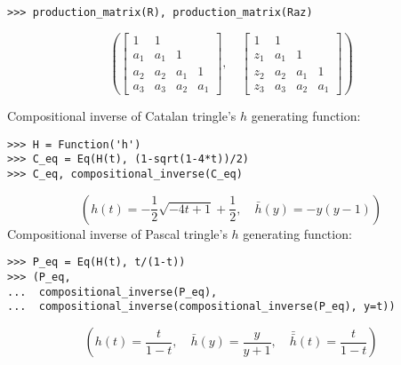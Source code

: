 \begin{example}
\begin{verbatim}
>>> production_matrix(R), production_matrix(Raz)
\end{verbatim}
\begin{displaymath}
\left ( \left[\begin{matrix}1 & 1 &   &  \\a_{1} & a_{1} & 1 &  \\a_{2} & a_{2} & a_{1} & 1\\a_{3} & a_{3} & a_{2} & a_{1}\end{matrix}\right], \quad \left[\begin{matrix}1 & 1 &   &  \\z_{1} & a_{1} & 1 &  \\z_{2} & a_{2} & a_{1} & 1\\z_{3} & a_{3} & a_{2} & a_{1}\end{matrix}\right]\right )
\end{displaymath}
\end{example}


\begin{example}
Compositional inverse of Catalan tringle's $h$ generating function:
\begin{verbatim}
>>> H = Function('h')
>>> C_eq = Eq(H(t), (1-sqrt(1-4*t))/2)
>>> C_eq, compositional_inverse(C_eq)
\end{verbatim}
\begin{displaymath}
\left ( h{\left (t \right )} = - \frac{1}{2} \sqrt{- 4 t + 1} + \frac{1}{2}, \quad \bar{ h }{\left (y \right )} = - y \left(y - 1\right)\right )
\end{displaymath}
Compositional inverse of Pascal tringle's $h$ generating function:
\begin{verbatim}
>>> P_eq = Eq(H(t), t/(1-t))
>>> (P_eq, 
...  compositional_inverse(P_eq), 
...  compositional_inverse(compositional_inverse(P_eq), y=t))
\end{verbatim}
\begin{displaymath}
\left ( h{\left (t \right )} = \frac{t}{1-t}, \quad \bar{ h }{\left (y \right )} = \frac{y}{y + 1}, \quad \bar{ \bar{ h } }{\left (t \right )} = \frac{t}{1-t}\right )
\end{displaymath}
\end{example}

